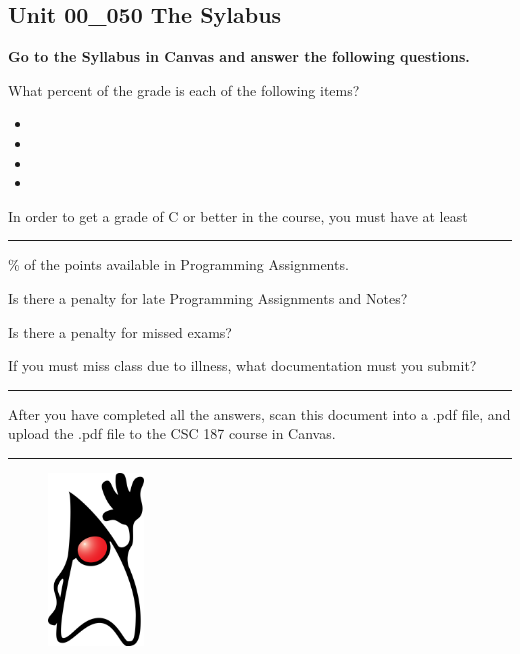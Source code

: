 \documentclass[letterpaper,12pt]{exam}
\newcommand{\unit}{Unit 00}
\begin{document}
\begin{questions}
\section*{\unit\_050 The Sylabus} %

\noindent \textbf{Go to the Syllabus in Canvas and answer the following questions.}

\begin{samepage}
	\question What percent of the grade is each of the following items?
	  \begin{itemize}
		\item {}
		\vspace{5mm}
		\item {}
		\vspace{5mm}
		\item {}
		\vspace{5mm}
		\item {}
		\vspace{5mm}
	   \end{itemize}
\end{samepage}

\begin{samepage}
	\question In order to get a grade of C or better in the course, you must have at least \rule{20mm}{0.15mm}\% of the points available in Programming Assignments.
	\vspace{5mm}
\end{samepage}

\begin{samepage}
	\question Is there a penalty for late Programming Assignments and Notes?
	\vspace{5mm}
\end{samepage}

\begin{samepage}
	\question Is there a penalty for missed exams?
	\vspace{5mm}
\end{samepage}

\begin{samepage}
	\question If you must miss class due to illness, what documentation must you submit?
	\vspace{5mm}
\end{samepage}


\end{questions}
\hrule
\vspace{5mm}
\noindent After you have completed all the answers, scan this document into a .pdf file, and upload the .pdf file to the CSC 187 course in Canvas. 
\vspace{5mm}
\hrule

\begin{figure}[b]\label{end}
	\center
	\includegraphics[width=1in]{../duke.png}
\end{figure}
\end{document}
